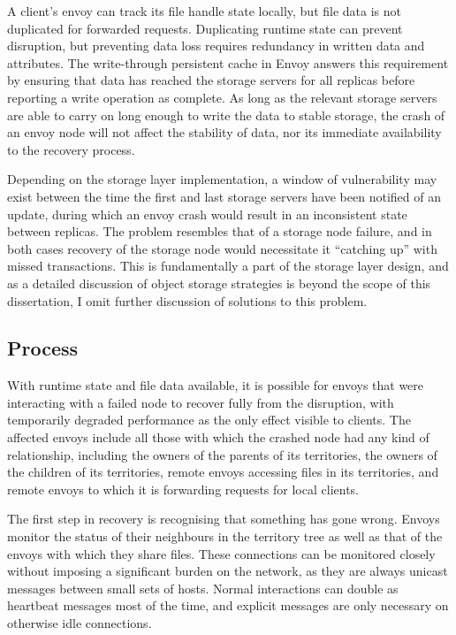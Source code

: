 A client's envoy can track its file handle state locally, but file data is not duplicated for forwarded requests. Duplicating runtime state can prevent disruption, but preventing data loss requires redundancy in written data and attributes. The write-through persistent cache in Envoy answers this requirement by ensuring that data has reached the storage servers for all replicas before reporting a write operation as complete. As long as the relevant storage servers are able to carry on long enough to write the data to stable storage, the crash of an envoy node will not affect the stability of data, nor its immediate availability to the recovery process.

Depending on the storage layer implementation, a window of vulnerability may exist between the time the first and last storage servers have been notified of an update, during which an envoy crash would result in an inconsistent state between replicas. The problem resembles that of a storage node failure, and in both cases recovery of the storage node would necessitate it ``catching up'' with missed transactions. This is fundamentally a part of the storage layer design, and as a detailed discussion of object storage strategies is beyond the scope of this dissertation, I omit further discussion of solutions to this problem.

\subsection{Process}

With runtime state and file data available, it is possible for envoys that were interacting with a failed node to recover fully from the disruption, with temporarily degraded performance as the only effect visible to clients. The affected envoys include all those with which the crashed node had any kind of relationship, including the owners of the parents of its territories, the owners of the children of its territories, remote envoys accessing files in its territories, and remote envoys to which it is forwarding requests for local clients.

The first step in recovery is recognising that something has gone wrong. Envoys monitor the status of their neighbours in the territory tree as well as that of the envoys with which they share files. These connections can be monitored closely without imposing a significant burden on the network, as they are always unicast messages between small sets of hosts. Normal interactions can double as heartbeat messages most of the time, and explicit messages are only necessary on otherwise idle connections.

